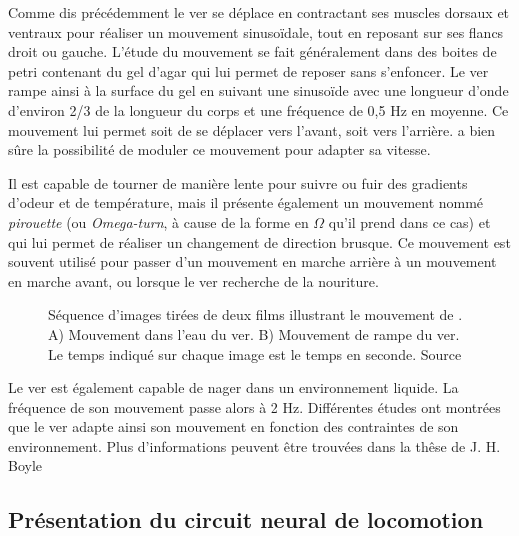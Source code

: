 Comme dis précédemment le ver se déplace en contractant ses muscles dorsaux et
ventraux pour réaliser un mouvement sinusoïdale, tout en reposant sur ses
flancs droit ou gauche. L'étude du mouvement se fait généralement dans des
boites de petri contenant du gel d'agar qui lui permet de reposer
sans s'enfoncer. Le ver rampe ainsi à la surface du gel en suivant une
sinusoïde avec une longueur d'onde d'environ 2/3 de la longueur du corps et 
une fréquence de 0,5 Hz en moyenne\cite{Boyle2009}. Ce mouvement lui permet
soit de se déplacer vers l'avant, soit vers l'arrière. \celeg{} a bien sûre
la possibilité de moduler ce mouvement pour adapter sa vitesse.

Il est capable de tourner de manière lente pour suivre ou fuir des gradients
d'odeur et de température, mais il présente également un mouvement nommé
\textit{pirouette} (ou \textit{Omega-turn}, à cause de la forme en $\Omega$ qu'il
prend dans ce cas) et qui lui permet de réaliser un changement de direction
brusque. Ce mouvement est souvent utilisé pour passer d'un mouvement en marche
arrière à un mouvement en marche avant, ou lorsque le ver recherche de la
nouriture.\\

\begin{figure}[ht]
   \begin{center}
   \end{center}
   \caption[Séquence d'image du mouvement de \celeg{}]{Séquence d'images tirées de deux films illustrant le mouvement de
   \celeg{}. A) Mouvement dans l'eau du ver. B) Mouvement de rampe du ver. Le
   temps indiqué sur chaque image est le temps en seconde. Source
   \cite{Boyle2009}}
   \label{fig:celegans_mouvement}
\end{figure}

Le ver est également capable de nager dans un environnement liquide. La fréquence
de son mouvement passe alors à 2 Hz. Différentes études ont montrées que le ver
adapte ainsi son mouvement en fonction des contraintes de son environnement.
Plus d'informations peuvent être trouvées dans la thêse de J. H. Boyle \cite{Boyle2009}


\subsection{Présentation du circuit neural de locomotion} %
\label{sub:Présentation du circuit neural de locomotion}

